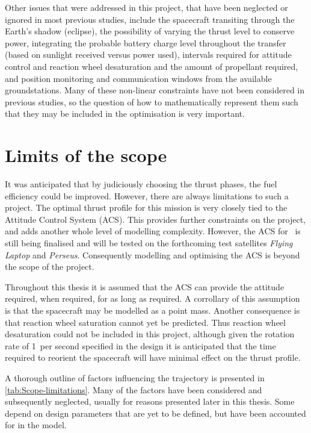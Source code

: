 Other issues that were addressed in this project, that have been neglected or ignored in most previous studies, include the spacecraft transiting through the Earth's shadow (eclipse), the possibility of varying the thrust level to conserve power, integrating the probable battery charge level throughout the transfer (based on sunlight received versus power used), intervals required for attitude control and reaction wheel desaturation and the amount of propellant required, and position monitoring and communication windows from the available groundstations. Many of these non-linear constraints have not been considered in previous studies, so the question of how to mathematically represent them such that they may be included in the optimisation is very important.


\section{Limits of the scope} \label{sec:Limits}

It was anticipated that by judiciously choosing the thrust phases, the fuel efficiency could be improved. However, there are always limitations to such a project. The optimal thrust profile for this mission is very closely tied to the Attitude Control System (ACS). This provides further constraints on the project, and adds another whole level of modelling complexity. However, the ACS for \BW\ is still being finalised and will be tested on the forthcoming test satellites \emph{Flying Laptop} and \emph{Perseus}. Consequently modelling and optimising the ACS is beyond the scope of the project. 

Throughout this thesis it is assumed that the ACS can provide the attitude required, when required, for as long as required. A corrollary of this assumption is that the spacecraft may be modelled as a point mass. Another consequence is that reaction wheel saturation cannot yet be predicted. Thus reaction wheel desaturation could not be included in this project, although given the rotation rate of 1\degrees\ per second specified in the design it is anticipated that the time required to reorient the spacecraft will have minimal effect on the thrust profile.

A thorough outline of factors influencing the trajectory is presented in \autoref{tab:Scope-limitations}. Many of the factors have been considered and subsequently neglected, usually for reasons presented later in this thesis. Some depend on design parameters that are yet to be defined, but have been accounted for in the model.

